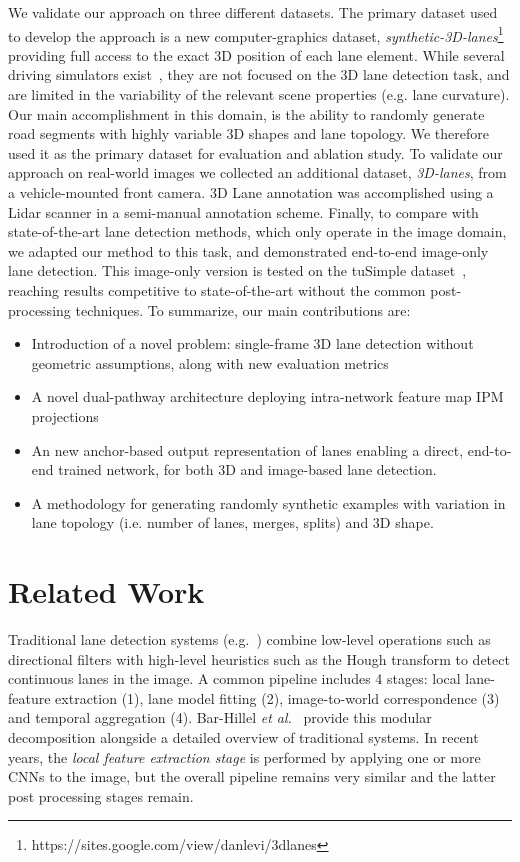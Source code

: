 \documentclass[10pt,twocolumn,letterpaper]{article}
\begin{document}
We validate our approach on three different datasets. The primary dataset used to develop the approach is a new computer-graphics dataset, \textit{synthetic-3D-lanes}\footnote{https://sites.google.com/view/danlevi/3dlanes} providing full access to the exact 3D position of each lane element. While several driving simulators exist~\cite{CARLA, AirSim}, they are not focused on the 3D lane detection task, and are limited in the variability of the relevant scene properties (e.g. lane curvature). Our main accomplishment in this domain, is the ability to randomly generate road segments with highly variable 3D shapes and lane topology. We therefore used it as the primary dataset for evaluation and ablation study. To validate our approach on real-world images we collected an additional dataset, \textit{3D-lanes}, from a vehicle-mounted front camera. 3D Lane annotation was accomplished using a Lidar scanner in a semi-manual annotation scheme. Finally, to compare with state-of-the-art lane detection methods, which only operate in the image domain, we adapted our method to this task, and demonstrated end-to-end image-only lane detection. This image-only version is tested on the tuSimple dataset~\cite{tu_simple}, reaching results competitive to state-of-the-art without the common post-processing techniques. To summarize, our main contributions are:





\begin{itemize}\addtolength{\itemsep}{-0.5\baselineskip}
	\item Introduction of a novel problem: single-frame 3D lane detection without geometric assumptions, along with new evaluation metrics
	\item A novel dual-pathway architecture deploying intra-network feature map IPM projections 
	\item An new anchor-based output representation of lanes enabling a direct, end-to-end trained network, for both 3D and image-based lane detection.
	\item A methodology for generating randomly synthetic examples with variation in lane topology (i.e. number of lanes, merges, splits) and 3D shape.
\end{itemize}

\section{Related Work}

Traditional lane detection systems (e.g.~\cite{Gopalan}) combine low-level operations such as directional filters with high-level heuristics such as the Hough transform to detect continuous lanes in the image. A common pipeline includes 4 stages: local lane-feature extraction (1), lane model fitting (2), image-to-world correspondence (3) and temporal aggregation (4). Bar-Hillel \textit{et al.}~\cite{aharon} provide this modular decomposition alongside a detailed overview of traditional systems. In recent years, the \textit{local feature extraction stage} is performed by applying one or more CNNs to the image, but the overall pipeline remains very similar and the latter post processing stages remain. 
\end{document}
